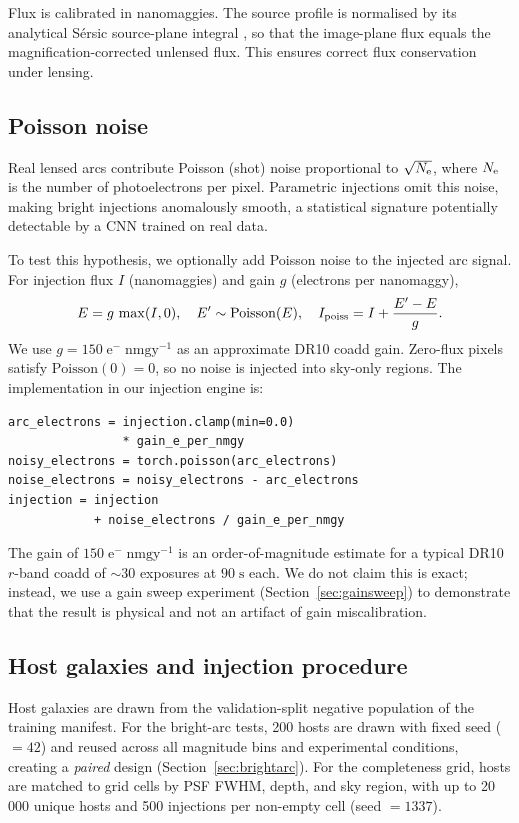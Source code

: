 \documentclass[fleqn,usenatbib]{mnras}
\begin{document}
Flux is calibrated in nanomaggies.  The source profile is normalised by its analytical S\'{e}rsic source-plane integral \citep{GrahamDriver2005}, so that the image-plane flux equals the magnification-corrected unlensed flux.  This ensures correct flux conservation under lensing.

\subsection{Poisson noise}

Real lensed arcs contribute Poisson (shot) noise proportional to $\sqrt{N_{\rm e}}$, where $N_{\rm e}$ is the number of photoelectrons per pixel.  Parametric injections omit this noise, making bright injections anomalously smooth, a statistical signature potentially detectable by a CNN trained on real data.

To test this hypothesis, we optionally add Poisson noise to the injected arc signal.  For injection flux $I$ (nanomaggies) and gain $g$ (electrons per nanomaggy),
\begin{equation}
E = g\,\max(I, 0), \quad E' \sim \mathrm{Poisson}(E), \quad I_{\rm poiss} = I + \frac{E' - E}{g} .
\label{eq:poisson}
\end{equation}
We use $g = 150\;\mathrm{e^{-}\;nmgy^{-1}}$ as an approximate DR10 coadd gain.  Zero-flux pixels satisfy $\mathrm{Poisson}(0) = 0$, so no noise is injected into sky-only regions.  The implementation in our injection engine is:
\begin{verbatim}
arc_electrons = injection.clamp(min=0.0)
                * gain_e_per_nmgy
noisy_electrons = torch.poisson(arc_electrons)
noise_electrons = noisy_electrons - arc_electrons
injection = injection
            + noise_electrons / gain_e_per_nmgy
\end{verbatim}

The gain of $150\;\mathrm{e^{-}\;nmgy^{-1}}$ is an order-of-magnitude estimate for a typical DR10 $r$-band coadd of $\sim\!30$ exposures at $90\;\mathrm{s}$ each.  We do not claim this is exact; instead, we use a gain sweep experiment (Section~\ref{sec:gainsweep}) to demonstrate that the result is physical and not an artifact of gain miscalibration.

\subsection{Host galaxies and injection procedure}

Host galaxies are drawn from the validation-split negative population of the training manifest.  For the bright-arc tests, 200 hosts are drawn with fixed seed ($= 42$) and reused across all magnitude bins and experimental conditions, creating a \emph{paired} design (Section~\ref{sec:brightarc}).  For the completeness grid, hosts are matched to grid cells by PSF FWHM, depth, and sky region, with up to 20\,000 unique hosts and 500 injections per non-empty cell (seed $= 1337$).
\end{document}
